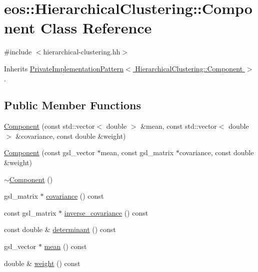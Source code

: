\hypertarget{classeos_1_1HierarchicalClustering_1_1Component}{
\section{eos::HierarchicalClustering::Component Class Reference}
\label{classeos_1_1HierarchicalClustering_1_1Component}
}


{\ttfamily \#include $<$hierarchical-\/clustering.hh$>$}

Inherits \hyperlink{classeos_1_1PrivateImplementationPattern}{PrivateImplementationPattern$<$ HierarchicalClustering::Component $>$}.\subsection*{Public Member Functions}
\begin{DoxyCompactItemize}
\item 
\hyperlink{classeos_1_1HierarchicalClustering_1_1Component_a1720f61d18110629f9e729a1bf9d81e8}{Component} (const std::vector$<$ double $>$ \&mean, const std::vector$<$ double $>$ \&covariance, const double \&weight)
\item 
\hyperlink{classeos_1_1HierarchicalClustering_1_1Component_a51da212f42ff52a2c85e7b870996f27c}{Component} (const gsl\_\-vector $\ast$mean, const gsl\_\-matrix $\ast$covariance, const double \&weight)
\item 
\hyperlink{classeos_1_1HierarchicalClustering_1_1Component_ab54a490e72686f90c0bf78ea9f756722}{$\sim$Component} ()
\item 
gsl\_\-matrix $\ast$ \hyperlink{classeos_1_1HierarchicalClustering_1_1Component_a7476d18489400cb38d9d5a9d84a8175b}{covariance} () const 
\item 
const gsl\_\-matrix $\ast$ \hyperlink{classeos_1_1HierarchicalClustering_1_1Component_acf9bec75b31723425216860cd83f640b}{inverse\_\-covariance} () const 
\item 
const double \& \hyperlink{classeos_1_1HierarchicalClustering_1_1Component_aa21ab8490577e43c23d8778da83e2e46}{determinant} () const 
\item 
gsl\_\-vector $\ast$ \hyperlink{classeos_1_1HierarchicalClustering_1_1Component_af164b5ba0a2ba3b3792a21fb284bb119}{mean} () const 
\item 
double \& \hyperlink{classeos_1_1HierarchicalClustering_1_1Component_a18b8d0c7a2fd0b9b6b15647803424564}{weight} () const 
\end{DoxyCompactItemize}


